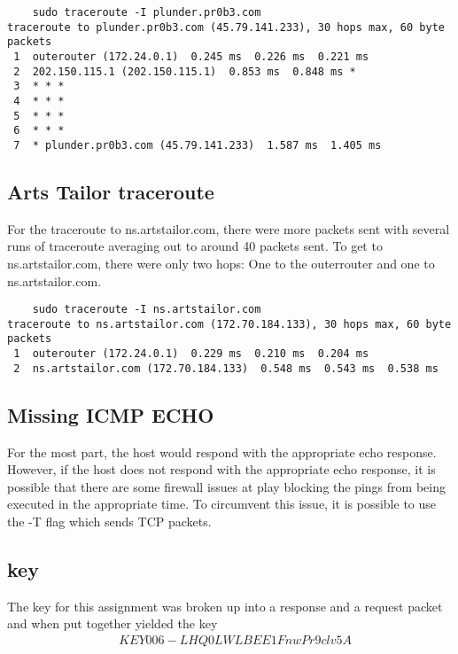 \documentclass[notitlepage]{article}
\begin{document}
    \begin{verbatim}
    sudo traceroute -I plunder.pr0b3.com
traceroute to plunder.pr0b3.com (45.79.141.233), 30 hops max, 60 byte packets
 1  outerouter (172.24.0.1)  0.245 ms  0.226 ms  0.221 ms
 2  202.150.115.1 (202.150.115.1)  0.853 ms  0.848 ms *
 3  * * *
 4  * * *
 5  * * *
 6  * * *
 7  * plunder.pr0b3.com (45.79.141.233)  1.587 ms  1.405 ms
    \end{verbatim}

    \subsection{Arts Tailor traceroute}
    For the traceroute to ns.artstailor.com, there were more packets sent with several runs of traceroute averaging out to around 40 packets sent. 
    To get to ns.artstailor.com, there were only two hops: One to the outerrouter and one to ns.artstailor.com. 
    \begin{verbatim}
    sudo traceroute -I ns.artstailor.com      
traceroute to ns.artstailor.com (172.70.184.133), 30 hops max, 60 byte packets
 1  outerouter (172.24.0.1)  0.229 ms  0.210 ms  0.204 ms
 2  ns.artstailor.com (172.70.184.133)  0.548 ms  0.543 ms  0.538 ms
    \end{verbatim}

    \subsection{Missing ICMP ECHO}
    For the most part, the host would respond with the appropriate echo response. However, if the host does not respond with the appropriate echo response, 
    it is possible that there are some firewall issues at play blocking the pings from being executed in the appropriate time. 
    To circumvent this issue, it is possible to use the -T flag which sends TCP packets. 
    \subsection{key}
    The key for this assignment was broken up into a response and a request packet and when put together yielded the key \\
    \begin{align*}
    &   KEY006-LHQ0LWLBEE1FnwPr9clv5A
    \end{align*}
\end{document}
